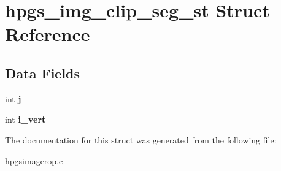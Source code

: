 \section{hpgs\_\-img\_\-clip\_\-seg\_\-st Struct Reference}
\label{structhpgs__img__clip__seg__st}
\subsection*{Data Fields}
\begin{DoxyCompactItemize}
\item 
int {\bfseries j}\label{structhpgs__img__clip__seg__st_af797a5fba88a048f97649bfb23bb586b}

\item 
int {\bfseries i\_\-vert}\label{structhpgs__img__clip__seg__st_a77584973318fdd05c5de8060b4aa3cf1}

\end{DoxyCompactItemize}


The documentation for this struct was generated from the following file:\begin{DoxyCompactItemize}
\item 
hpgsimagerop.c\end{DoxyCompactItemize}
